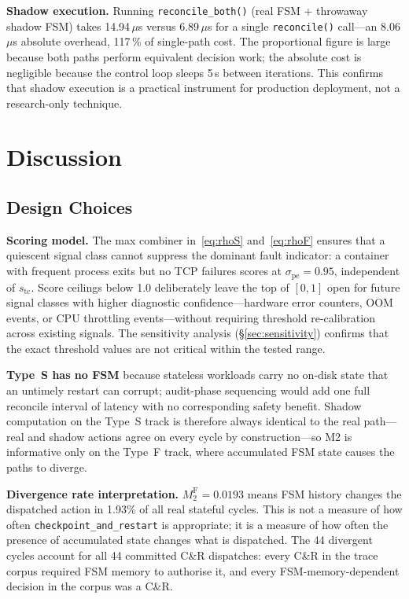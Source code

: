 \documentclass[conference]{IEEEtran}
\begin{document}
\textbf{Shadow execution.} Running \texttt{reconcile\_both()} (real FSM + throwaway shadow FSM) takes 14.94\,$\mu$s versus 6.89\,$\mu$s for a single \texttt{reconcile()} call---an 8.06\,$\mu$s absolute overhead, 117\,\% of single-path cost. The proportional figure is large because both paths perform equivalent decision work; the absolute cost is negligible because the control loop sleeps 5\,s between iterations. This confirms that shadow execution is a practical instrument for production deployment, not a research-only technique.

\section{Discussion}
\label{sec:discussion}

\subsection{Design Choices}

\textbf{Scoring model.} The max combiner in~\eqref{eq:rhoS} and~\eqref{eq:rhoF} ensures that a quiescent signal class cannot suppress the dominant fault indicator: a container with frequent process exits but no TCP failures scores at $\sigma_{\mathrm{pe}} = 0.95$, independent of $s_{\mathrm{tc}}$. Score ceilings below 1.0 deliberately leave the top of $[0, 1]$ open for future signal classes with higher diagnostic confidence---hardware error counters, OOM events, or CPU throttling events---without requiring threshold re-calibration across existing signals. The sensitivity analysis (§\ref{sec:sensitivity}) confirms that the exact threshold values are not critical within the tested range.

\textbf{Type~S has no FSM} because stateless workloads carry no on-disk state that an untimely restart can corrupt; audit-phase sequencing would add one full reconcile interval of latency with no corresponding safety benefit. Shadow computation on the Type~S track is therefore always identical to the real path---real and shadow actions agree on every cycle by construction---so M2 is informative only on the Type~F track, where accumulated FSM state causes the paths to diverge.

\textbf{Divergence rate interpretation.} $M_2^\mathrm{F} = 0.0193$ means FSM history changes the dispatched action in 1.93\% of all real stateful cycles. This is not a measure of how often \texttt{checkpoint\_and\_restart} is appropriate; it is a measure of how often the presence of accumulated state changes what is dispatched. The 44 divergent cycles account for all 44 committed C\&R dispatches: every C\&R in the trace corpus required FSM memory to authorise it, and every FSM-memory-dependent decision in the corpus was a C\&R.
\end{document}
